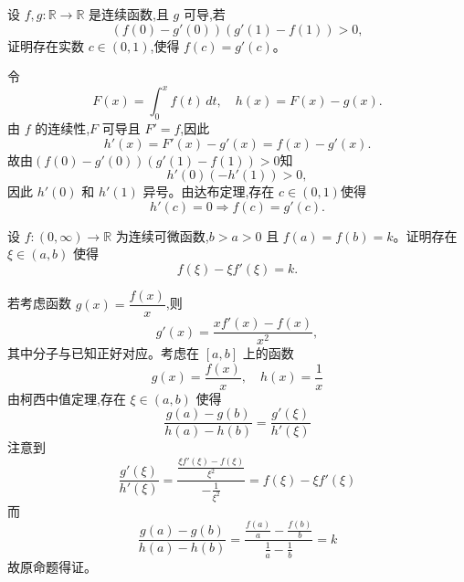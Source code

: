 \begin{questions}
    \question 设 $f,g:\mathbb{R}\to\mathbb{R}$ 是连续函数,且 $g$ 可导,若
    \[
    (f(0)-g'(0))(g'(1)-f(1))>0,
    \]
    证明存在实数 $c\in(0,1)$,使得 $f(c)=g'(c)$。
    \begin{solution}
        令
        \[
        F(x)=\int_0^x f(t)\,dt, \quad h(x)=F(x)-g(x).
        \]
        由 $f$ 的连续性,$F$ 可导且 $F'=f$,因此
        \[
        h'(x)=F'(x)-g'(x)=f(x)-g'(x).
        \]
        故由$(f(0)-g'(0))(g'(1)-f(1))>0$知
        \[
        h'(0)(-h'(1))>0,
        \]
        因此 $h'(0)$ 和 $h'(1)$ 异号。由达布定理,存在 $c\in(0,1)$使得
        \[
        h'(c)=0 \Rightarrow f(c)=g'(c).
        \]
    \end{solution}

    \question 设 $f: (0,\infty) \to \mathbb{R}$ 为连续可微函数,$b > a > 0$ 且 $f(a) = f(b) = k$。证明存在 $\xi \in (a, b)$ 使得
    \[
    f(\xi) - \xi f'(\xi) = k.
    \]
    \begin{solution}
        若考虑函数 $g(x) = \dfrac{f(x)}{x}$,则
        \[
        g'(x) = \frac{xf'(x) - f(x)}{x^2},
        \]
        其中分子与已知正好对应。考虑在 $[a,b]$ 上的函数 
        \[
        g(x) = \frac{f(x)}{x},\quad h(x) = \frac{1}{x}
        \]
        由柯西中值定理,存在 $\xi \in (a, b)$ 使得
        \[
        \frac{g(a) - g(b)}{h(a) - h(b)} = \frac{g'(\xi)}{h'(\xi)}
        \]
        注意到
        \[
        \frac{g'(\xi)}{h'(\xi)} = \frac{\frac{\xi f'(\xi) - f(\xi)}{\xi^2}}{-\frac{1}{\xi^2}} = f(\xi) - \xi f'(\xi)
        \]
        而
        \[
        \frac{g(a) - g(b)}{h(a) - h(b)} = \frac{\frac{f(a)}{a} - \frac{f(b)}{b}}{\frac{1}{a} - \frac{1}{b}} = k
        \]
        故原命题得证。
    \end{solution}


\end{questions}
